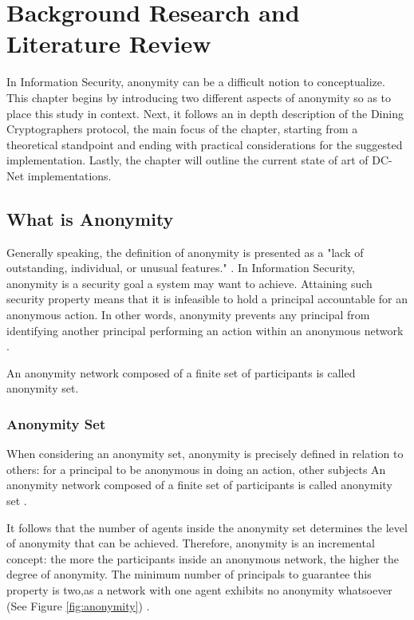 \chapter{Background Research and Literature Review}

In Information Security, anonymity can be a difficult notion to conceptualize. This chapter begins by introducing two different aspects of anonymity so as to place this study in context. Next, it follows an in depth description of the Dining Cryptographers protocol, the main focus of the chapter, starting from a theoretical standpoint and ending with practical considerations for the suggested implementation. Lastly, the chapter will outline the current state of art of DC-Net implementations.

\section{What is Anonymity}
Generally speaking, the definition of anonymity is presented as a "lack of outstanding, individual, or unusual features." \cite{Anonymity}. In Information Security, anonymity is a security goal a system may want to achieve. Attaining such security property means that it is infeasible to hold a principal accountable for an anonymous action. In other words, anonymity prevents any principal from identifying another principal performing an action within an anonymous network \cite{Malkhi}.

An anonymity network composed of a finite set of participants is called anonymity set.

\subsection{Anonymity Set} \label{sec:anonymityset}
When considering an anonymity set, anonymity is precisely defined in relation to others: for a principal to be anonymous in doing an action, other subjects An anonymity network composed of a finite set of participants is called anonymity set \cite{Pfitzmann}.

It follows that the number of agents inside the anonymity set determines the level of anonymity that can be achieved. Therefore, anonymity is an incremental concept: the more the participants inside an anonymous network, the higher the degree of anonymity. The minimum number of principals to guarantee this property is two,as a network with one agent exhibits no anonymity whatsoever (See Figure \ref{fig:anonymity}) \cite{Franck}.

